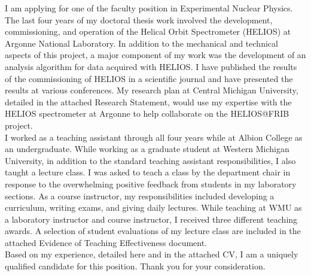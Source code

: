 I am applying for one of the faculty position in Experimental Nuclear Physics. The last four years of my doctoral thesis work involved the development, commissioning, and operation of the Helical Orbit Spectrometer (HELIOS) at Argonne National Laboratory.  In addition to the mechanical and technical aspects of this project, a major component of my work was the development of an  analysis algorithm for data acquired with HELIOS.  I have published the results of the commissioning of HELIOS in a scientific journal %
 and have presented the results at various conferences. My research plan at Central Michigan University, detailed in the attached Research Statement, would use my expertise with the HELIOS spectrometer at Argonne to help collaborate on the HELIOS@FRIB project.\\

I worked as a teaching assistant through all four years while at Albion College as an undergraduate.  While working as a graduate student at Western Michigan University, in addition to the standard teaching assistant responsibilities, I also taught a lecture class.   %
 I was asked to teach a class by the department chair in response to the overwhelming positive feedback from students in my laboratory sections.  As a course instructor, my responsibilities included developing a curriculum, writing exams, and giving daily lectures.  While teaching at WMU as a laboratory instructor and course instructor, I received three different teaching awards.  A selection of student evaluations of my lecture class are included in the attached Evidence of Teaching Effectiveness document.\\

Based on my experience, detailed here and in the attached CV, I am a uniquely qualified candidate for this position.
Thank you for your consideration.